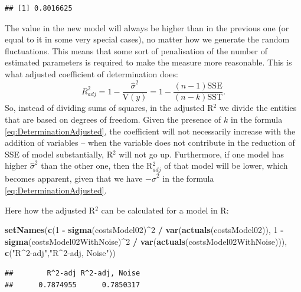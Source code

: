 \documentclass[
]{book}
\newenvironment{Shaded}{\begin{snugshade}}{\end{snugshade}}
\newcommand{\DecValTok}[1]{\textcolor[rgb]{0.00,0.00,0.81}{#1}}
\newcommand{\FunctionTok}[1]{\textcolor[rgb]{0.13,0.29,0.53}{\textbf{#1}}}
\newcommand{\NormalTok}[1]{#1}
\newcommand{\SpecialCharTok}[1]{\textcolor[rgb]{0.81,0.36,0.00}{\textbf{#1}}}
\newcommand{\StringTok}[1]{\textcolor[rgb]{0.31,0.60,0.02}{#1}}
\theoremstyle{definition}
\theoremstyle{definition}
\theoremstyle{definition}
\theoremstyle{definition}
\theoremstyle{remark}
\begin{document}
\begin{verbatim}
## [1] 0.8016625
\end{verbatim}

The value in the new model will always be higher than in the previous one (or equal to it in some very special cases), no matter how we generate the random fluctuations. This means that some sort of penalisation of the number of estimated parameters is required to make the measure more reasonable. This is what adjusted coefficient of determination does:
\begin{equation}
    R^2_{adj} = 1 - \frac{\hat{\sigma}^2}{\mathrm{V}(y)} = 1 - \frac{(n-1)\mathrm{SSE}}{(n-k)\mathrm{SST}} .
    \label{eq:DeterminationAdjusted}
\end{equation}
So, instead of dividing sums of squares, in the adjusted R\(^2\) we divide the entities that are based on degrees of freedom. Given the presence of \(k\) in the formula \eqref{eq:DeterminationAdjusted}, the coefficient will not necessarily increase with the addition of variables -- when the variable does not contribute in the reduction of SSE of model substantially, R\(^2\) will not go up. Furthermore, if one model has higher \(\hat{\sigma}^2\) than the other one, then the R\(^2_{adj}\) of that model will be lower, which becomes apparent, given that we have \(-\hat{\sigma}^2\) in the formula \eqref{eq:DeterminationAdjusted}.

Here how the adjusted R\(^2\) can be calculated for a model in R:

\begin{Shaded}
\begin{Highlighting}[]
\FunctionTok{setNames}\NormalTok{(}\FunctionTok{c}\NormalTok{(}\DecValTok{1} \SpecialCharTok{{-}} \FunctionTok{sigma}\NormalTok{(costsModel02)}\SpecialCharTok{\^{}}\DecValTok{2} \SpecialCharTok{/} \FunctionTok{var}\NormalTok{(}\FunctionTok{actuals}\NormalTok{(costsModel02)),}
           \DecValTok{1} \SpecialCharTok{{-}} \FunctionTok{sigma}\NormalTok{(costsModel02WithNoise)}\SpecialCharTok{\^{}}\DecValTok{2} \SpecialCharTok{/} \FunctionTok{var}\NormalTok{(}\FunctionTok{actuals}\NormalTok{(costsModel02WithNoise))),}
         \FunctionTok{c}\NormalTok{(}\StringTok{"R\^{}2{-}adj"}\NormalTok{,}\StringTok{"R\^{}2{-}adj, Noise"}\NormalTok{))}
\end{Highlighting}
\end{Shaded}

\begin{verbatim}
##        R^2-adj R^2-adj, Noise 
##      0.7874955      0.7850317
\end{verbatim}
\end{document}
